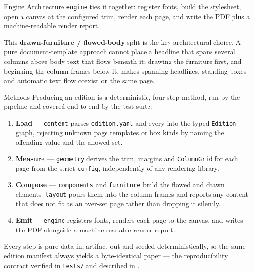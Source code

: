 \documentclass[
  ignorenonframetext,
]{beamer}
\providecommand{\tightlist}{%
  \setlength{\itemsep}{0pt}\setlength{\parskip}{0pt}}
\begin{document}
\begin{frame}{Engine Architecture}
\texttt{engine} ties it together: register fonts, build the stylesheet,
open a canvas at the configured trim, render each page, and write the
PDF plus a machine-readable render report.

This \textbf{drawn-furniture / flowed-body} split is the key
architectural choice. A pure document-template approach cannot place a
headline that spans several columns above body text that flows beneath
it; drawing the furniture first, and beginning the column frames below
it, makes spanning headlines, standing boxes and automatic text flow
coexist on the same page.
\end{frame}

\begin{frame}{Methods}
\protect{}\label{methods}
Producing an edition is a deterministic, four-step method, run by the
pipeline and covered end-to-end by the test suite:

\begin{enumerate}
\tightlist
\item
  \textbf{Load} --- \texttt{content} parses \texttt{edition.yaml} and
  every  into the typed \texttt{Edition}
  graph, rejecting unknown page templates or box kinds by naming the
  offending value and the allowed set.
\item
  \textbf{Measure} --- \texttt{geometry} derives the trim, margins and
  \texttt{ColumnGrid} for each page from the strict \texttt{config},
  independently of any rendering library.
\item
  \textbf{Compose} --- \texttt{components} and \texttt{furniture} build
  the flowed and drawn elements; \texttt{layout} pours them into the
  column frames and reports any content that does not fit as an over-set
  page rather than dropping it silently.
\item
  \textbf{Emit} --- \texttt{engine} registers fonts, renders each page
  to the canvas, and writes the PDF alongside a machine-readable render
  report.
\end{enumerate}

Every step is pure-data-in, artifact-out and seeded deterministically,
so the same edition manifest always yields a byte-identical paper ---
the reproducibility contract verified in \texttt{tests/} and described
in .
\end{frame}
\end{document}
